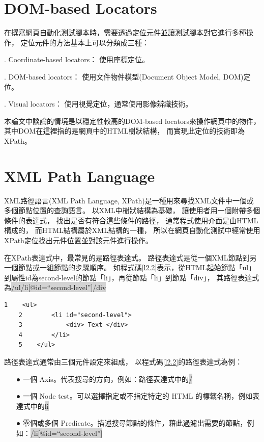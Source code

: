 \section{DOM-based Locators}\label{s2.3}
在撰寫網頁自動化測試腳本時，需要透過定位元件並讓測試腳本對它進行多種操作，
定位元件的方法基本上可以分類成三種\cite{Web-Locators}：

. Coordinate-based locators： 使用座標定位。

. DOM-based locators： 使用文件物件模型(Document Object Model, DOM)\cite{DOM}定位。

. Visual locators： 使用視覺定位，通常使用影像辨識技術。

\indent
本論文中談論的情境是以穩定性較高的DOM-based locators來操作網頁中的物件，其中DOM在這裡指的是網頁中的HTML樹狀結構，
而實現此定位的技術即為XPath。

\section{XML Path Language}\label{s2.4}
XML路徑語言(XML Path Language, XPath)是一種用來尋找XML文件\cite{XML}中一個或多個節點位置的查詢語言\cite{XPath}。
以XML中樹狀結構為基礎，
讓使用者用一個附帶多個條件的表達式，
找出是否有符合這些條件的路徑，
通常程式使用介面是由HTML構成的，
而HTML結構屬於XML結構的一種，
所以在網頁自動化測試中經常使用XPath定位找出元件位置\cite{Test-Case-Aging-By-XPath}並對該元件進行操作。

在XPath表達式中，最常見的是路徑表達式\cite{XPath-Selenium-Selectors}。
路徑表達式是從一個XML節點到另一個節點或一組節點的步驟順序。
如程式碼\ref{l2.2}表示，從HTML起始節點「ul」到屬性id為second-level的節點「li」，再從節點「li」到節點「div」，
其路徑表達式為\colorbox{lightgray}{/ul/li[@id=``second-level'']/div}

\begin{lstlisting}[caption=HTML結構範例, label={l2.2}]
    1    <ul> 
    2        <li id="second-level">
    3            <div> Text </div>
    4        </li>
    5    </ul>
\end{lstlisting}

路徑表達式通常由三個元件設定來組成，
以程式碼\ref{l2.2}的路徑表達式為例：

\begin{itemize}
\item[●] 一個 Axis。代表搜尋的方向，例如：路徑表達式中的\colorbox{lightgray}{/}
\item[●] 一個 Node test。可以選擇指定或不指定特定的 HTML 的標籤名稱，例如表達式中的\colorbox{lightgray}{li}
\item[●] 零個或多個 Predicate。描述搜尋節點的條件，藉此過濾出需要的節點，例如：\colorbox{lightgray}{/li[@id=``second-level'']}
\end{itemize}

